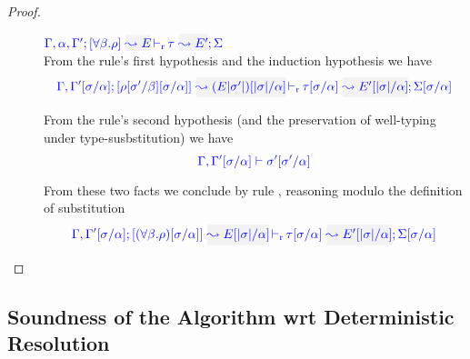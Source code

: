 \begin{proof}
\begin{description}
\item[]\quad$\dmres{\tenv,\alpha,\tenv'}{\tall{\beta}{\rulet}}{E}{\type}{E'}{\Sigma}$\\

  From the rule's first hypothesis and the induction hypothesis we have 
\begin{equation*}
  \dmres{\tenv,\tenv'[\suty/\alpha]}{\rulet[\suty'/\beta][\suty/\alpha]}{(E |\suty'|)[|\suty|/\alpha]}{\type[\suty/\alpha]}{E'[|\suty|/\alpha]}{\Sigma[\suty/\alpha]}
\end{equation*}

  From the rule's second hypothesis (and the preservation of well-typing under type-susbstitution) we have
\begin{equation*}
{\color{blue} \Gamma,\Gamma'[\sigma/\alpha] \vdash\sigma'[\sigma'/\alpha]}
\end{equation*}

  From these two facts we conclude by rule , reasoning modulo
  the definition of substitution
\begin{equation*}
  \dmres{\tenv,\tenv'[\suty/\alpha]}{(\tall{\beta}{\rulet})[\suty/\alpha]}{E[|\suty|/\alpha]}{\type[\suty/\alpha]}{E'[|\suty|/\alpha]}{\Sigma[\suty/\alpha]}
\end{equation*}
\end{description}
\end{proof}

\subsection{Soundness of the Algorithm wrt Deterministic Resolution}


